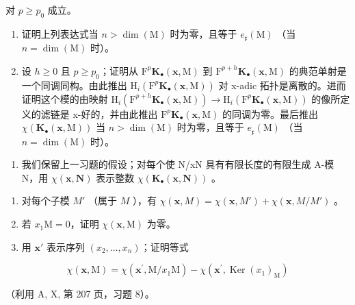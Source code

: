 对 \(p \geqslant p_0\) 成立。

\begin{enumerate}
\def\labelenumi{\alph{enumi})}
\setcounter{enumi}{2}
\item
  证明上列表达式当 \(n > \dim(\mathrm{M})\) 时为零，且等于 \(e_{\mathfrak{x}}(\mathrm{M})\) （当 \(n = \dim(\mathrm{M})\) 时）。
\item
  设 \(h \geqslant 0\) 且 \(p \geqslant p_{0}\)；证明从 \(\mathrm{F}^{p}\mathbf{K}_{\bullet}(\mathbf{x},\mathrm{M})\) 到 \(\mathrm{F}^{p+h}\mathbf{K}_{\bullet}(\mathbf{x},\mathrm{M})\) 的典范单射是一个同调同构。由此推出 \(\mathrm{H}_{i}(\mathrm{F}^{p}\mathbf{K}_{\bullet}(\mathbf{x},\mathrm{M}))\) 对 x-adic 拓扑是离散的。进而证明这个模的由映射 \(\mathrm{H}_{i}(\mathrm{F}^{p+h}\mathbf{K}_{\bullet}(\mathbf{x},\mathrm{M})) \to \mathrm{H}_{i}(\mathrm{F}^{p}\mathbf{K}_{\bullet}(\mathbf{x},\mathrm{M}))\) 的像所定义的滤链是 x-好的，并由此推出 \(\mathrm{F}^{p}\mathbf{K}_{\bullet}(\mathbf{x},\mathrm{M})\) 的同调为零。最后推出 \(\chi(\mathbf{K}_{\bullet}(\mathbf{x},\mathrm{M}))\) 当 \(n > \dim(\mathrm{M})\) 时为零，且等于 \(e_{\mathfrak{x}}(\mathrm{M})\) （当 \(n = \dim(\mathrm{M})\) 时）。
\end{enumerate}

\begin{enumerate}
\def\labelenumi{\arabic{enumi})}
\setcounter{enumi}{5}
\tightlist
\item
  我们保留上一习题的假设；对每个使 N/xN 具有有限长度的有限生成 A-模 N，用 \(\chi(\mathbf{x},\mathbf{N})\) 表示整数 \(\chi(\mathbf{K}_{\bullet}(\mathbf{x},\mathbf{N}))\) 。
\end{enumerate}

\begin{enumerate}
\def\labelenumi{\alph{enumi})}
\item
  对每个子模 \(M'\) （属于 \(M\) ），有 \(\chi(\mathbf{x}, M) = \chi(\mathbf{x}, M') + \chi(\mathbf{x}, M/M')\) 。
\item
  若 \(x_{1}\mathrm{M} = 0\)，证明 \(\chi (\mathbf{x},\mathrm{M})\) 为零。
\item
  用 \(\mathbf{x}'\) 表示序列 \((x_2,\ldots ,x_n)\)；证明等式
\end{enumerate}

\[
\chi (\mathbf {x}, \mathrm{M}) = \chi (\mathbf {x} ^ {\prime}, \mathrm{M} / x _ {1} \mathrm{M}) - \chi (\mathbf {x} ^ {\prime}, \operatorname{Ker} (x _ {1}) _ {\mathrm{M}})
\]

（利用 A, X, 第 207 页，习题 8）。

